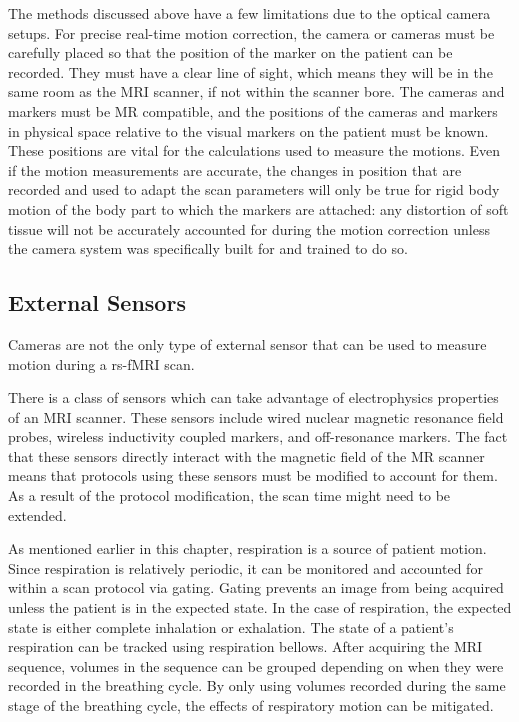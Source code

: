 The methods discussed above have a few limitations due to the optical camera setups. For precise real-time motion correction, the camera or cameras must be carefully placed so that the position of the marker on the patient can be recorded. They must have a clear line of sight, which means they will be in the same room as the MRI scanner, if not within the scanner bore. The cameras and markers must be MR compatible, and the positions of the cameras and markers in physical space relative to the visual markers on the patient must be known. These positions are vital for the calculations used to measure the motions. Even if the motion measurements are accurate, the changes in position that are recorded and used to adapt the scan parameters will only be true for rigid body motion of the body part to which the markers are attached: any distortion of soft tissue will not be accurately accounted for during the motion correction unless the camera system was specifically built for and trained to do so. 

\subsection{External Sensors}

Cameras are not the only type of external sensor that can be used to measure motion during a rs-fMRI scan. 

There is a class of sensors which can take advantage of electrophysics properties of an MRI scanner. These sensors include wired nuclear magnetic resonance field probes, wireless inductivity coupled markers, and off-resonance markers. %
The fact that these sensors directly interact with the magnetic field of the MR scanner means that protocols using these sensors must be modified to account for them. As a result of the protocol modification, the scan time might need to be extended.

As mentioned earlier in this chapter, respiration is a source of patient motion. Since respiration is relatively periodic, it can be monitored and accounted for within a scan protocol via gating. Gating prevents an image from being acquired unless the patient is in the expected state. In the case of respiration, the expected state is either complete inhalation or exhalation. The state of a patient's respiration can be tracked using respiration bellows. After acquiring the MRI sequence, volumes in the sequence can be grouped depending on when they were recorded in the breathing cycle. By only using volumes recorded during the same stage of the breathing cycle, the effects of respiratory motion can be mitigated.

